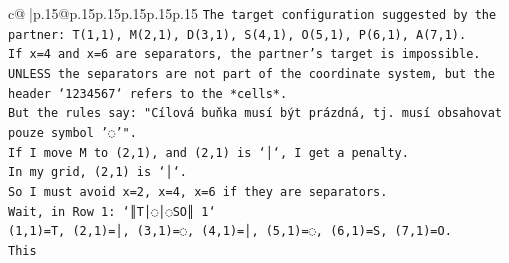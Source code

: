\documentclass{article}
\begin{document}
{\begin{supertabular}{c@{$\;$}|p{.15\linewidth}@{}p{.15\linewidth}p{.15\linewidth}p{.15\linewidth}p{.15\linewidth}p{.15\linewidth}}
{{{\texttt{The target configuration suggested by the partner: T(1,1), M(2,1), D(3,1), S(4,1), O(5,1), P(6,1), A(7,1).} \\
\texttt{If x=4 and x=6 are separators, the partner's target is impossible.} \\
\texttt{UNLESS the separators are not part of the coordinate system, but the header `1234567` refers to the *cells*.} \\
\texttt{But the rules say: "Cílová buňka musí být prázdná, tj. musí obsahovat pouze symbol '◌'".} \\
\texttt{If I move M to (2,1), and (2,1) is `│`, I get a penalty.} \\
\texttt{In my grid, (2,1) is `│`.} \\
\texttt{So I must avoid x=2, x=4, x=6 if they are separators.} \\
\texttt{Wait, in Row 1: `║T│◌│◌SO║ 1`} \\
\texttt{(1,1)=T, (2,1)=│, (3,1)=◌, (4,1)=│, (5,1)=◌, (6,1)=S, (7,1)=O.} \\
\texttt{This} \\
            }
        }
    }
     \\ \\


\end{supertabular}}
\end{document}
